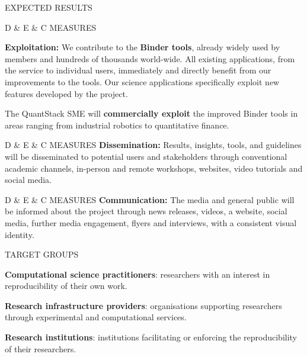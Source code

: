 \begin{multicols}{2}
\begin{summarybox}{EXPECTED RESULTS}
\end{summarybox}\vspace{\summaryBoxSpacing}
\begin{summarybox}{D \& E \& C MEASURES}

\textbf{Exploitation:} We contribute to the \textbf{Binder tools},
already widely used by \TheProject members and hundreds of thousands world-wide.
All existing applications, from the \mybinder{} service to individual users,
immediately and directly benefit from our improvements to the tools.
Our science applications specifically exploit new features developed by the project.

The QuantStack SME will \textbf{commercially exploit} the improved Binder tools in areas ranging from
industrial robotics to quantitative finance.

\end{summarybox}\vspace{\summaryBoxSpacing}

\begin{summarybox}{D \& E \& C MEASURES}
\textbf{Dissemination:} Results, insights, tools, and guidelines will
  be disseminated to potential users and stakeholders through conventional
  academic channels, in-person and remote workshops, websites, video tutorials
  and social media.
\end{summarybox}

\begin{summarybox}{D \& E \& C MEASURES}
\textbf{Communication:} The media and general public will be informed
  about the project through news releases, videos, a website, social media,
  further media engagement, flyers and interviews, with a consistent visual
  identity.
\end{summarybox}

\begin{summarybox}{TARGET GROUPS}

\textbf{Computational science practitioners}: researchers with an interest in reproducibility of their own work.

\textbf{Research infrastructure providers}: organisations supporting researchers
through experimental and computational services.

\textbf{Research institutions}: institutions facilitating or enforcing the reproducibility of their researchers.


\end{summarybox}
\end{multicols}
